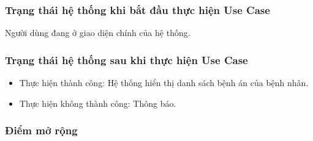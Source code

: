 \subsubsection{Trạng thái hệ thống khi bắt đầu thực hiện Use Case}
Người dùng đang ở giao diện chính của hệ thống.

\subsubsection{Trạng thái hệ thống sau khi thực hiện Use Case}
\begin{itemize}
  \item Thực hiện thành công: Hệ thống hiển thị danh sách bệnh án của bệnh nhân.
  \item Thực hiện không thành công: Thông báo.
\end{itemize}

\subsubsection{Điểm mở rộng}